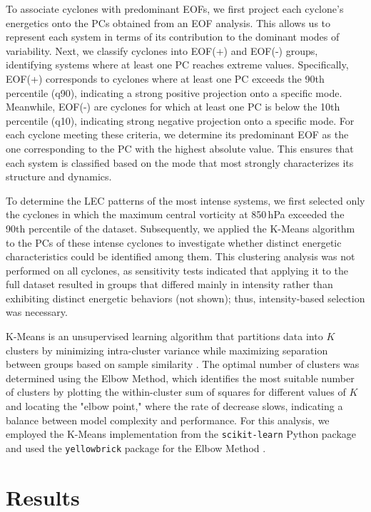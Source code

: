 \documentclass[pdflatex,sn-chicago]{sn-jnl}%
\theoremstyle{plain}
\theoremstyle{definition}
\theoremstyle{remark}
\theoremstyle{definition}
\begin{document}
To associate cyclones with predominant EOFs, we first project each cyclone's energetics onto the PCs obtained from an EOF analysis. This allows us to represent each system in terms of its contribution to the dominant modes of variability. Next, we classify cyclones into EOF(+) and EOF(-) groups, identifying systems where at least one PC reaches extreme values. Specifically, EOF(+) corresponds to cyclones where at least one PC exceeds the 90th percentile (q90), indicating a strong positive projection onto a specific mode. Meanwhile, EOF(-) are  cyclones for which at least one PC is below the 10th percentile (q10), indicating strong negative projection onto a specific mode. For each cyclone meeting these criteria, we determine its predominant EOF as the one corresponding to the PC with the highest absolute value. This ensures that each system is classified based on the mode that most strongly characterizes its structure and dynamics.

To determine the LEC patterns of the most intense systems, we first selected only the cyclones in which the maximum central vorticity at 850\,hPa exceeded the 90th percentile of the dataset. Subsequently, we applied the K-Means algorithm to the PCs of these intense cyclones to investigate whether distinct energetic characteristics could be identified among them. This clustering analysis was not performed on all cyclones, as sensitivity tests indicated that applying it to the full dataset resulted in groups that differed mainly in intensity rather than exhibiting distinct energetic behaviors (not shown); thus, intensity-based selection was necessary. 

K-Means is an unsupervised learning algorithm that partitions data into \( K \) clusters by minimizing intra-cluster variance while maximizing separation between groups based on sample similarity \citep{macqueen1967,hartiganwong1979}. The optimal number of clusters was determined using the Elbow Method, which identifies the most suitable number of clusters by plotting the within-cluster sum of squares for different values of \( K \) and locating the "elbow point," where the rate of decrease slows, indicating a balance between model complexity and performance. For this analysis, we employed the K-Means implementation from the \texttt{scikit-learn} Python package \citep{hao2019machine} and used the \texttt{yellowbrick} package for the Elbow Method \citep{bengfort2019yellowbrick}.



\section{Results}\label{sec:results}
\end{document}
